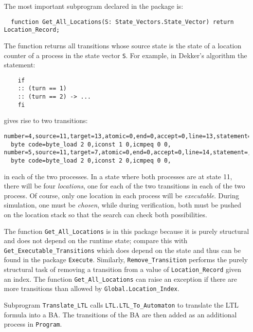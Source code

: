 \documentclass[11pt]{article}
\newcommand*{\p}[1]{\texttt{#1}}
\begin{document}
The most important subprogram declared in the package is:

\begin{footnotesize}
\begin{verbatim}
  function Get_All_Locations(S: State_Vectors.State_Vector) return Location_Record;
\end{verbatim}
\end{footnotesize}

The function returns all transitions whose source state is the state
of a location counter of a process in the state vector \p{S}. For example,
in Dekker's algorithm the statement:

\begin{footnotesize}
\begin{verbatim}
    if
    :: (turn == 1)
    :: (turn == 2) -> ...
    fi
\end{verbatim}
\end{footnotesize}

gives rise to two transitions:

\begin{footnotesize}
\begin{verbatim}
number=4,source=11,target=13,atomic=0,end=0,accept=0,line=13,statement=,
  byte code=byte_load 2 0,iconst 1 0,icmpeq 0 0,
number=5,source=11,target=7,atomic=0,end=0,accept=0,line=14,statement=,
  byte code=byte_load 2 0,iconst 2 0,icmpeq 0 0,
\end{verbatim}
\end{footnotesize}
in each of the two processes. In a state where both processes are at
state 11, there will be four \emph{locations}, one for each of the two
transitions in each of the two process. Of course, only one location in each
process will be \emph{executable}. During simulation, one must be
\emph{chosen}, while during verification, both must be pushed on the
location stack so that the search can check both possibilities.

The function \p{Get\_All\_Locations} is in this package because it is
purely structural and does not depend on the runtime state; compare this
with \p{Get\_Executable\_Transitions} which does depend on the state and
thus can be found in the package \p{Execute}. Similarly,
\p{Remove\_Transition} performs the purely structural task of removing a
transition from a value of \p{Location\_Record} given an index. The
function \p{Get\_All\_Locations} can raise an exception if there are
more transitions than allowed by \p{Global.Location\_Index}.

Subprogram \p{Translate\_LTL} calls \p{LTL.LTL\_To\_Automaton} to
translate the LTL formula into a BA. The transitions of the BA are then
added as an additional process in \p{Program}.
\end{document}
